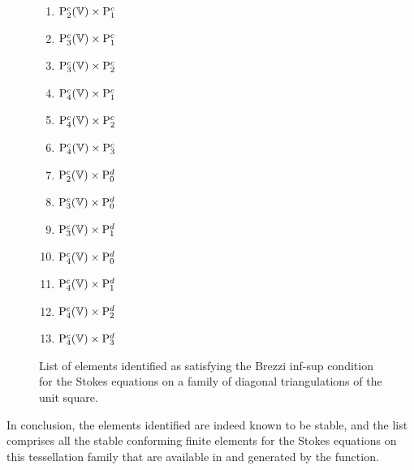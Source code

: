 \begin{figure}
  \begin{center}
    \begin{minipage}[t]{0.3\linewidth}
      \begin{enumerate}
      \item $\mathrm{P}^c_2(\mathbb{V}) \times \mathrm{P}^c_1$
      \item $\mathrm{P}^c_3(\mathbb{V}) \times \mathrm{P}^c_1$
      \item $\mathrm{P}^c_3(\mathbb{V}) \times \mathrm{P}^c_2$
      \item $\mathrm{P}^c_4(\mathbb{V}) \times \mathrm{P}^c_1$
      \item $\mathrm{P}^c_4(\mathbb{V}) \times \mathrm{P}^c_2$
      \end{enumerate}
    \end{minipage}
    \begin{minipage}[t]{0.3\linewidth}
      \begin{enumerate}
        \setcounter{enumi}{5}
      \item $\mathrm{P}^c_4(\mathbb{V}) \times \mathrm{P}^c_3$
      \item $\mathrm{P}^c_2(\mathbb{V}) \times \mathrm{P}^d_0$
      \item $\mathrm{P}^c_3(\mathbb{V}) \times \mathrm{P}^d_0$
      \item $\mathrm{P}^c_3(\mathbb{V}) \times \mathrm{P}^d_1$
      \end{enumerate}
      \end{minipage}
    \begin{minipage}[t]{0.3\linewidth}
      \begin{enumerate}
        \setcounter{enumi}{9}
      \item $\mathrm{P}^c_4(\mathbb{V}) \times \mathrm{P}^d_0$
      \item $\mathrm{P}^c_4(\mathbb{V}) \times \mathrm{P}^d_1$
      \item $\mathrm{P}^c_4(\mathbb{V}) \times \mathrm{P}^d_2$
      \item $\mathrm{P}^c_4(\mathbb{V}) \times \mathrm{P}^d_3$
      \end{enumerate}
    \end{minipage}
  \end{center}
  \caption{List of elements identified as satisfying the Brezzi
    inf-sup condition for the Stokes equations on a family of diagonal
    triangulations of the unit square.}
  \label{rognes:fig:stokeslist}
\end{figure}

In conclusion, the elements identified are indeed known to be stable,
and the list comprises all the stable conforming finite elements for
the Stokes equations on this tessellation family that are available in
\ffc{} and generated by the  function.


